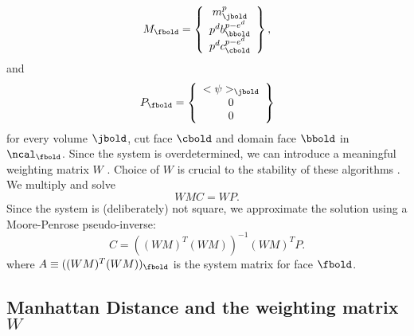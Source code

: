 \documentclass{article}
\begin{document}
{\begin{equation}
  M_\fbold =\left\{
    \begin{array}{c} 
       m^p_\jbold  \\
       p^d b^{p-e^d}_\bbold  \\
       p^d c^{p-e^d}_\cbold  
    \end{array}
 \right\},
\end{equation}
and
\begin{equation}
  P_\fbold =
    \left\{
    \begin{array}{c} 
       <\psi>_\jbold  \\
      0  \\
      0  
    \end{array}
    \right\}
\end{equation}
for every volume $\jbold$, cut face $\cbold$ and domain face $\bbold$
in $\ncal_\fbold$.
Since the system is overdetermined, we can introduce a 
meaningful weighting matrix $W$ \footnotemark[4]. 
 Choice of $W$
is crucial to the stability of these algorithms
\footnotemark[5].   
We multiply and solve
\begin{equation*}
WMC = WP.
\end{equation*}
Since the system is (deliberately) not square, we approximate
the solution using a Moore-Penrose pseudo-inverse:
\begin{equation}
  C = ((WM)^T(WM))^{-1} (WM)^T P.
\label{eqn::getC}  
\end{equation}
where $A \equiv ((WM)^T(WM))_\fbold$ is the system matrix for face
$\fbold$.

\subsection{Manhattan Distance and the weighting matrix $W$}

}
\end{document}
